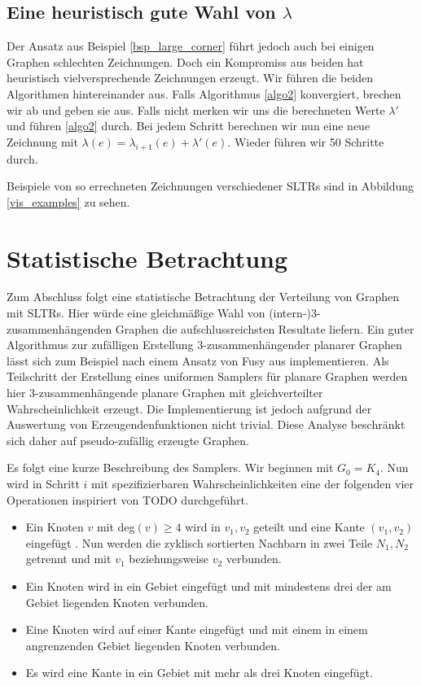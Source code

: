 \subsection{Eine heuristisch gute Wahl von $\lambda$}

Der Ansatz aus Beispiel \ref{bsp_large_corner} führt jedoch auch bei einigen Graphen schlechten Zeichnungen. Doch ein Kompromiss aus beiden hat heuristisch vielversprechende Zeichnungen erzeugt. Wir führen die beiden Algorithmen hintereinander aus. Falls Algorithmus \ref{algo2} konvergiert, brechen wir ab und geben sie aus. Falls nicht merken wir uns die berechneten Werte $\lambda'$ und führen \ref{algo2} durch. Bei jedem Schritt berechnen wir nun eine neue Zeichnung mit $\lambda(e) = \lambda_{i+1}(e) + \lambda'(e)$. Wieder führen wir 50 Schritte durch. 

Beispiele von so errechneten Zeichnungen verschiedener SLTRs sind in Abbildung \ref{vis_examples} zu sehen.

\section{Statistische Betrachtung}

Zum Abschluss folgt eine statistische Betrachtung der Verteilung von Graphen mit SLTRs. Hier würde eine gleichmäßige Wahl von (intern-)3-zusammenhängenden Graphen die aufschlussreichsten Resultate liefern. Ein guter Algorithmus zur zufälligen Erstellung 3-zusammenhängender planarer Graphen lässt sich zum Beispiel nach einem Ansatz von Fusy aus \cite{fusy09} implementieren. Als Teilschritt der Erstellung eines uniformen Samplers für planare Graphen werden hier 3-zusammenhängende planare Graphen mit gleichverteilter Wahrscheinlichkeit erzeugt. Die Implementierung ist jedoch aufgrund der Auswertung von Erzeugendenfunktionen nicht trivial. Diese Analyse beschränkt sich daher auf pseudo-zufällig erzeugte Graphen. 

Es folgt eine kurze Beschreibung des Samplers. Wir beginnen mit $G_0 = K_4$. Nun wird in Schritt $i$ mit spezifizierbaren Wahrscheinlichkeiten eine der folgenden vier Operationen inspiriert von TODO durchgeführt.

\begin{itemize}
\item Ein Knoten $v$ mit deg$(v) \geq 4$ wird in $v_1,v_2$ geteilt und eine Kante $(v_1,v_2)$ eingefügt . Nun werden die zyklisch sortierten Nachbarn in zwei Teile $N_1,N_2$ getrennt und mit $v_1$ beziehungsweise $v_2$ verbunden.
\item Ein Knoten wird in ein Gebiet eingefügt und mit mindestens drei der am Gebiet liegenden Knoten verbunden. 
\item Eine Knoten wird auf einer Kante eingefügt und mit einem in einem angrenzenden Gebiet liegenden Knoten verbunden.
\item Es wird eine Kante in ein Gebiet mit mehr als drei Knoten eingefügt.
\end{itemize}

